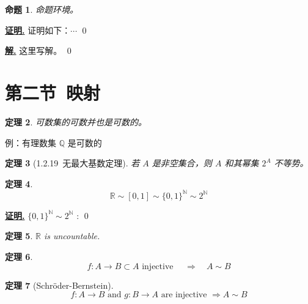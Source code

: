 \documentclass[10pt,openany]{book}
\theoremstyle{thmstyle} %
\newtheorem{theorem}{定理}[chapter]
\theoremstyle{defstyle} %
\theoremstyle{prostyle} %
\newtheorem{proposition}[theorem]{命题}
\renewenvironment{proof}[1][证明]{\par\underline{\textbf{#1.}} \;\fangsong}{\qed\par}
\newenvironment{solution}{\par\underline{\textbf{解.}} \;\kaishu}{\qed\par}
\begin{document}
    \begin{proposition}
        命题环境。
    \end{proposition}

    \begin{proof}
        证明如下：$\cdots$
    \end{proof}

    \begin{solution}
        这里写解。
    \end{solution}

\section{第二节~映射}

\begin{theorem}
可数集的可数并也是可数的。
\end{theorem}

例：有理数集 $\mathbb{Q}$ 是可数的

\begin{theorem}[1.2.19~无最大基数定理]
若 $A$ 是非空集合，则 $A$ 和其幂集 $2^A$ 不等势。
\end{theorem}

\begin{theorem}
\begin{equation}
\mathbb{R} \sim[0,1] \sim \{0,1\}^{\mathbb{N}} \sim 2^{\mathbb{N}}
\end{equation}
\end{theorem}

\begin{proof}
$\{0,1\}^{\mathbb{N}} \sim 2^{\mathbb{N}}$ :
\end{proof}

\begin{theorem}
$\mathbb{R}$ is uncountable.
\end{theorem}

\begin{theorem}
\begin{equation}
f: A \rightarrow B \subset A \text { injective } \quad \Rightarrow \quad A \sim B 
\end{equation}
\end{theorem}

\begin{theorem}[Schröder-Bernstein]
\begin{equation}
f: A \rightarrow B \text { and } g: B \rightarrow A \text { are injective } \Rightarrow A \sim B 
\end{equation}
\end{theorem}
\end{document}

